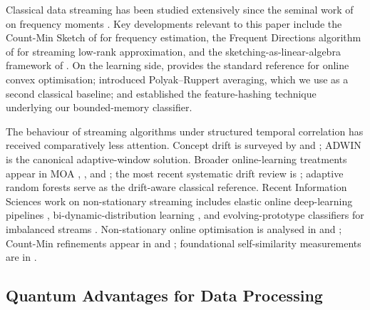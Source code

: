 \documentclass[preprint,12pt,authoryear]{elsarticle}
\begin{document}
Classical data streaming has been studied extensively since the seminal work of \citet{alon1999space} on frequency moments \citep{muthukrishnan2005data}. Key developments relevant to this paper include the Count-Min Sketch of \citet{cormode2005improved} for frequency estimation, the Frequent Directions algorithm of \citet{ghashami2016frequent} for streaming low-rank approximation, and the sketching-as-linear-algebra framework of \citet{woodruff2014sketching}. On the learning side, \citet{shalev2012online} provides the standard reference for online convex optimisation; \citet{polyak1992averaging} introduced Polyak--Ruppert averaging, which we use as a second classical baseline; and \citet{weinberger2009featurehashing} established the feature-hashing technique underlying our bounded-memory classifier.

The behaviour of streaming algorithms under structured temporal correlation has received comparatively less attention. Concept drift is surveyed by \citet{gama2014driftsurvey} and \citet{ditzler2015nonstationary}; ADWIN \citep{bifet2007adwin} is the canonical adaptive-window solution. Broader online-learning treatments appear in MOA \citep{bifet2010moa}, \citet{hoi2021online}, and \citet{gama2010knowledge}; the most recent systematic drift review is \citet{arora2024driftreview}; adaptive random forests \citep{gomes2017adaptiverf} serve as the drift-aware classical reference. Recent Information Sciences work on non-stationary streaming includes elastic online deep-learning pipelines \citep{su2024elasticonline}, bi-dynamic-distribution learning \citep{yan2024bidynamic}, and evolving-prototype classifiers for imbalanced streams \citep{wu2024evolvingprototypes}. Non-stationary online optimisation is analysed in \citet{besbes2015non} and \citet{ben2010agnostic}; Count-Min refinements appear in \citet{benmazziane2022countmin} and \citet{cormode2011synopses}; foundational self-similarity measurements are in \citet{park2000selfsimilar}.

\subsection{Quantum Advantages for Data Processing}
\end{document}
